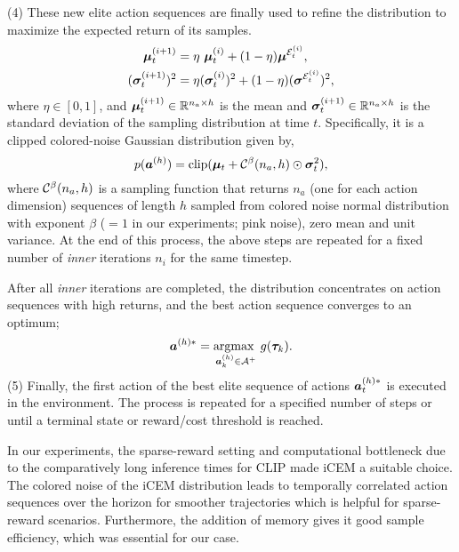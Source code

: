 (4) These new elite action sequences are finally used to refine the distribution to maximize the expected return of its samples.
\vspace{-1.5pt}
\begin{align}
    \label{eq:icem-update}
    \bm{\mu}_{t}^{(i+1)} &= \eta\ \bm{\mu}_t^{(i)} + (1-\eta)\bm{\mu}^{\mathcal{E}_t^{(i)}},\\
    (\bm{\sigma}_{t}^{(i+1)})^2 &= \eta(\bm{\sigma}_t^{(i)})^2 + (1-\eta)(\bm{\sigma}^{\mathcal{E}_t^{(i)}})^2,
\end{align}
where \(\eta \in [0, 1]\), and \(\bm{\mu}_{t}^{(i+1)} \in \mathbb{R}^{n_a \times h}\) is the mean and \(\bm{\sigma}_{t}^{(i+1)} \in \mathbb{R}^{n_a \times h}\) is the standard deviation of the sampling distribution at time \(t\). Specifically, it is a clipped colored-noise Gaussian distribution given by,
\begin{equation}
    \label{eq:icem-distribution}
    p(\bm{a}^{(h)}) = \text{clip}(\bm{\mu}_t + \mathcal{C}^\beta(n_a, h) \odot \bm{\sigma}_t^2),
\end{equation}
where \(\mathcal{C}^\beta(n_a, h)\) is a sampling function that returns \(n_a\) (one for each action dimension) sequences of length \(h\) sampled from colored noise normal distribution with exponent \(\beta\) (\(= 1\) in our experiments; pink noise), zero mean and unit variance. 
At the end of this process, the above steps are repeated for a fixed number of \emph{inner} iterations \(n_i\) for the same timestep.

After all \emph{inner} iterations are completed, the distribution concentrates on action sequences with high returns, and the best action sequence converges to an optimum;
\begin{equation}
    \label{eq:planning-goal}
    \bm{a}^{(h)*} = \operatorname*{argmax~}_{\bm{a}^{(h)}_k \in \mathcal{A}^+} g(\bm{\tau}_k).
\end{equation}
(5) Finally, the first action of the best elite sequence of actions \(\bm{a}^{(h)*}_t\) is executed in the environment.
The process is repeated for a specified number of steps or until a terminal state or reward/cost threshold is reached.

In our experiments, the sparse-reward setting and computational bottleneck due to the comparatively long inference times for CLIP made iCEM a suitable choice.
The colored noise of the iCEM distribution leads to temporally correlated action sequences over the horizon for smoother trajectories which is helpful for sparse-reward scenarios.
Furthermore, the addition of memory gives it good sample efficiency, which was essential for our case.

